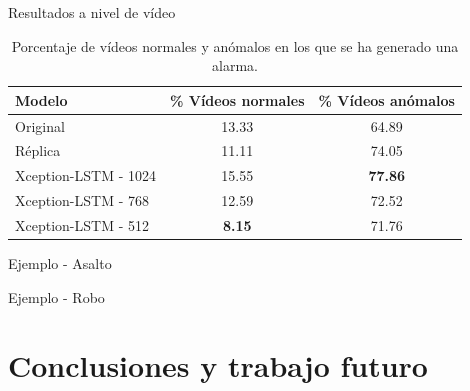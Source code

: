 \documentclass[10pt]{beamer}
\begin{document}
\begin{frame}{Resultados a nivel de vídeo}
  \begin{table}[H]
    \centering
    \begin{tabular}{lcc}
      \toprule
      Modelo & \% Vídeos normales  & \% Vídeos anómalos \\
      \midrule
      Original & 13.33 & 64.89 \\
      Réplica & 11.11 & 74.05 \\
      Xception-LSTM - 1024 & 15.55 & \textbf{77.86} \\
      Xception-LSTM - 768 & 12.59 & 72.52 \\
      Xception-LSTM - 512 & \textbf{8.15} & 71.76 \\
      \bottomrule
    \end{tabular}
    \caption{Porcentaje de vídeos normales y anómalos en los que se ha
      generado una alarma.}
  \end{table}
\end{frame}

\begin{frame}{Ejemplo - Asalto}
  \begin{figure}
    \centering
  \end{figure}
\end{frame}

\begin{frame}{Ejemplo - Robo}
  \begin{figure}
    \centering
  \end{figure}
\end{frame}

\section{Conclusiones y trabajo futuro}
\end{document}

